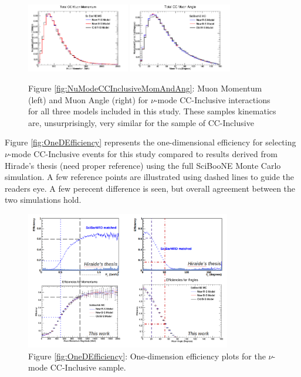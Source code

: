 \documentclass[11pt]{article}
\begin{document}
\begin{figure}[H]
\centering
\includegraphics[width=0.4\textwidth]{CCInclusivePlots/NMCCInclusiveTotalMomentum.png}
\includegraphics[width=0.4\textwidth]{CCInclusivePlots/NMCCInclusiveTotalAngle.png}
\caption*{Figure \ref*{fig:NuModeCCInclusiveMomAndAng}: Muon Momentum (left) and Muon Angle (right) for $\nu$-mode CC-Inclusive interactions for all three models included in this study. These samples kinematics are, unsurprisingly, very similar for the sample of CC-Inclusive}
\end{figure}\label{fig:NuModeCCInclusiveMomAndAng}


Figure \ref*{fig:OneDEfficiency} represents the one-dimensional efficiency for selecting $\nu$-mode CC-Inclusive events for this study compared to results derived from Hirade's thesis (need proper reference) using the full SciBooNE Monte Carlo simulation. A few reference points are illustrated using dashed lines to guide the readers eye. A few perecent difference is seen, but overall agreement between the two simulations hold. 

\begin{figure}[H]
\centering
\includegraphics[width=0.8\textwidth]{CCInclusivePlots/CCInc1DEff.png}
\caption*{Figure \ref*{fig:OneDEfficiency}: One-dimension efficiency plots for the $\nu$-mode CC-Inclusive sample.}
\end{figure}\label{fig:OneDEfficiency}
\end{document}
